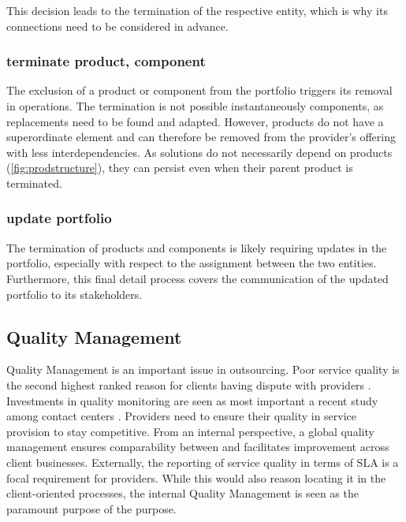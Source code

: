 		This decision leads to the termination of the respective entity, which is why its connections need to be considered in advance. 
		
		\subsubsection{terminate product, component}
		The exclusion of a product or component from the portfolio triggers its removal in operations. The termination is not  possible instantaneously \wrt components, as replacements need to be found and adapted. However, products do not have a superordinate element and can therefore be removed from the provider's offering with less interdependencies. As solutions do not necessarily depend on products (\cf \Fig \ref{fig:prodstructure}), they can persist even when their parent product is terminated. 
		
		
		\subsubsection{update portfolio}
		The termination of products and components is likely requiring updates in the portfolio, especially with respect to the assignment between the two entities. Furthermore, this final detail process covers the communication of the updated portfolio to its stakeholders. 

	\subsection{Quality Management}
		\label{sec:qualmang}
		
		Quality Management is an important issue in outsourcing. Poor service quality is the second highest ranked reason for clients having dispute with providers \citep{deloitte2014outsourcing}. Investments in quality monitoring are seen as most important a recent study among contact centers \citep{ccnet2016}. Providers need to ensure their quality in service provision to stay competitive. From an internal perspective, a global quality management ensures comparability between and facilitates improvement across client businesses. Externally, the reporting of service quality in terms of \acrshort{SLA} is a focal requirement for providers. While this would also reason locating it in the client-oriented processes, the internal Quality Management is seen as the paramount purpose of the purpose. 
		
